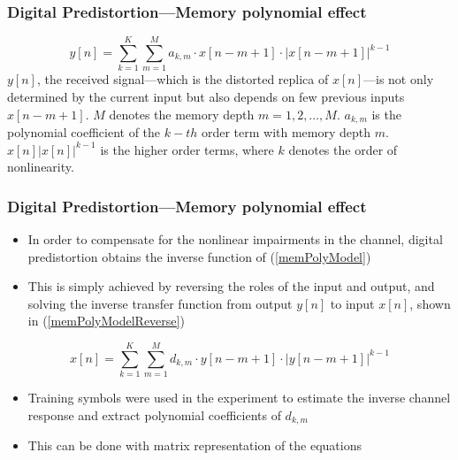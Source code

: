 \documentclass[t]{beamer}
\begin{document}
\begin{frame}
    \frametitle{Digital Predistortion---Memory polynomial effect}
    \begin{equation}
        y\left[n\right] = \sum_{k=1}^{K}\sum_{m=1}^{M}a_{k,m}\cdot x\left[n-m+1\right]\cdot |x\left[n-m+1\right]|^{k-1} 
        \label{memPolyModel}
    \end{equation}
    \(y\left[n\right]\), the received signal---which is the distorted replica of 
    \(x\left[n\right]\)---is not only determined by the current input but also depends on few previous inputs \(x\left[n-m+1\right]\).
    \(M\) denotes the memory depth \(m=1,2,\ldots,M\).
    \(a_{k,m}\) is the polynomial coefficient of the \(k-th\) order term with memory depth \(m\).
    \(x\left[n\right]|x\left[n\right]|^{k-1}\) is the higher order terms, where \(k\) denotes the order of nonlinearity.

\end{frame}

\begin{frame}
    \frametitle{Digital Predistortion---Memory polynomial effect}
    \begin{itemize}
        \item In order to compensate for the nonlinear impairments in the channel, digital predistortion obtains the inverse function of (\ref{memPolyModel})
        \item This is simply achieved by reversing the roles of the input and output, and solving the inverse transfer function from output \(y\left[n\right]\) to input \(x\left[n\right]\), shown in (\ref{memPolyModelReverse})
        
    \end{itemize}
    \begin{equation}
        x\left[n\right] = \sum_{k=1}^{K}\sum_{m=1}^{M}d_{k,m}\cdot y\left[n-m+1\right]\cdot |y\left[n-m+1\right]|^{k-1} 
        \label{memPolyModelReverse}
    \end{equation}

    \begin{itemize}
        \item Training symbols were used in the experiment to estimate the inverse channel response and extract polynomial coefficients of \(d_{k,m}\)
        \item This can be done with matrix representation of the equations
    \end{itemize}


\end{frame}
\end{document}
